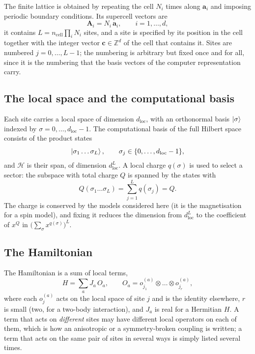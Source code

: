 \documentclass[12pt]{article}
\newcommand{\Hil}{\mathscr{H}}
\begin{document}
The finite lattice is obtained by repeating the cell $N_i$ times along
$\mathbf{a}_i$ and imposing periodic boundary conditions. Its supercell vectors
are
\begin{equation}
  \mathbf{A}_i = N_i\,\mathbf{a}_i, \qquad i = 1,\dots,d,
\end{equation}
it contains $L = n_{\mathrm{cell}}\prod_i N_i$ sites, and a site is specified by
its position in the cell together with the integer vector $\mathbf{c} \in
\mathbb{Z}^d$ of the cell that contains it. Sites are numbered
$j = 0,\dots,L-1$; the numbering is arbitrary but fixed once and for all, since
it is the numbering that the basis vectors of the computer representation carry.

\subsection{The local space and the computational basis}

Each site carries a local space of dimension $d_{\mathrm{loc}}$, with an
orthonormal basis $\ket{\sigma}$ indexed by $\sigma = 0,\dots,d_{\mathrm{loc}}-1$.
The computational basis of the full Hilbert space consists of the product states
\begin{equation}
  \ket{\sigma_1\dots\sigma_L}, \qquad \sigma_j \in \{0,\dots,d_{\mathrm{loc}}-1\},
\end{equation}
and $\Hil$ is their span, of dimension $d_{\mathrm{loc}}^L$. A local charge
$q(\sigma)$ is used to select a sector: the subspace with total charge $Q$ is
spanned by the states with
\begin{equation}
  Q(\sigma_1\dots\sigma_L) = \sum_{j=1}^{L} q(\sigma_j) = Q .
  \label{eq:charge}
\end{equation}
The charge is conserved by the models considered here (it is the magnetisation
for a spin model), and fixing it reduces the dimension from $d_{\mathrm{loc}}^L$ to
the coefficient of $x^Q$ in $\bigl(\sum_\sigma x^{q(\sigma)}\bigr)^L$.

\subsection{The Hamiltonian}

The Hamiltonian is a sum of local terms,
\begin{equation}
  H = \sum_{a} J_a\, O_a, \qquad
  O_a = o^{(a)}_{j_1}\otimes \dots \otimes o^{(a)}_{j_r},
  \label{eq:hamiltonian}
\end{equation}
where each $o^{(a)}_{j}$ acts on the local space of site $j$ and is the identity
elsewhere, $r$ is small (two, for a two-body interaction), and $J_a$ is real for
a Hermitian $H$. A term that acts on \emph{different} sites may have different
local operators on each of them, which is how an anisotropic or a
symmetry-broken coupling is written; a term that acts on the same pair of sites
in several ways is simply listed several times.
\end{document}
